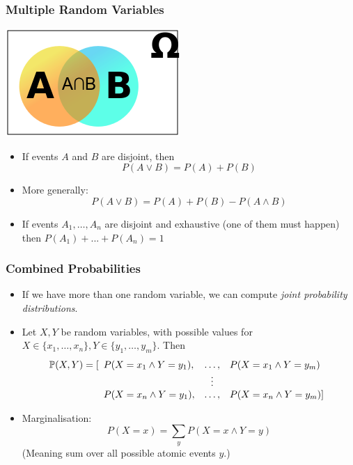 \documentclass[xcolor=dvipsnames,ignorenonframetext]{beamer}
\newcommand{\Pb}{\mathbb{P}}
\begin{document}
\begin{frame}
  \frametitle{Multiple Random Variables}
  \begin{center}
    \includegraphics[width=.4\linewidth]{Probability_venn_a_b_intersection}
  \end{center}
  \begin{itemize}
  \item If events $A$ and $B$ are disjoint, then
    \[P(A \vee B) = P(A) + P(B)\]
  \item More generally:
    \[P(A \vee B) = P(A) + P(B) - P(A \wedge B)\]
  \item If events $A_1, \ldots, A_n$ are disjoint and exhaustive (one of them
    must happen) then $P(A_1) + ... + P(A_n) = 1$
  \end{itemize}
\end{frame}

\begin{frame}
  \frametitle{Combined Probabilities}
  \begin{itemize}
  \item If we have more than one random variable, we can compute \emph{joint probability distributions}.
  \item Let $X,Y$ be random variables, with possible values for
    $X\in\{x_1,\ldots,x_n\}, Y\in\{y_1,\ldots,y_m\}$.
    Then 
    \[\Pb(X,Y)=[\begin{array}[t]{lcl}
      P(X=x_1\wedge Y=y_1), & \ldots, & P(X=x_1\wedge Y=y_m) \\
      & \vdots &\\
      P(X=x_n\wedge Y=y_1), & \ldots, & P(X=x_n\wedge Y=y_m) ]
      \end{array}
      \]
  \item Marginalisation: 
    \[P(X=x)=\sum_y P(X=x\wedge Y=y)\]
    (Meaning sum over all possible atomic events $y$.)
  \end{itemize}
\end{frame}
\end{document}
